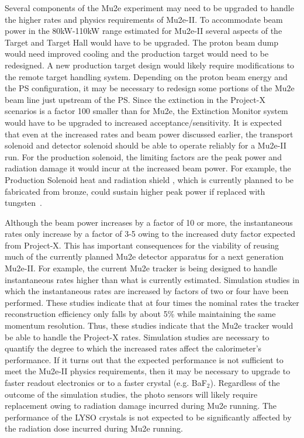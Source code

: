 %

Several components of the Mu2e experiment may need to be upgraded to
handle the higher rates and physics requirements of Mu2e-II.  To
accommodate beam power in the 80kW-110kW range estimated for Mu2e-II
several aspects of the Target and Target Hall would have to be
upgraded.  The proton beam dump would need improved cooling and the
production target would need to be redesigned.  A new production
target design would likely require modifications to the remote target
handling system.  Depending on the proton beam energy and the PS
configuration, it may be necessary to redesign some portions of the
Mu2e beam line just upstream of the PS. Since the extinction in the
Project-X scenarios is a factor 100 smaller than for Mu2e, the
Extinction Monitor system would have to be upgraded to increased
acceptance/sensitivity.  It is expected that even at the increased
rates and beam power discussed earlier, the transport solenoid and
detector solenoid should be able to operate reliably for a Mu2e-II
run. For the production solenoid, the limiting factors are the peak
power and radiation damage it would incur at the increased beam power.
For example, the Production Solenoid heat and radiation shield , which
is currently planned to be fabricated from bronze, could sustain
higher peak power if replaced with tungsten~\cite{Mu2eII}.

Although the beam power increases by a factor of 10 or more, the
instantaneous rates only increase by a factor of 3-5 owing to the
increased duty factor expected from Project-X.  This has important
consequences for the viability of reusing much of the currently
planned Mu2e detector apparatus for a next generation Mu2e-II.  For
example, the current Mu2e tracker is being designed to handle
instantaneous rates higher than what is currently estimated.
Simulation studies in which the instantaneous rates are increased by
factors of two or four have been performed.  These studies indicate
that at four times the nominal rates the tracker reconstruction
efficiency only falls by about 5\% while maintaining the same momentum
resolution.  Thus, these studies indicate that the Mu2e tracker would
be able to handle the Project-X rates.  Simulation studies are
necessary to quantify the degree to which the increased rates affect
the calorimeter's performance.  If it turns out that the expected
performance is not sufficient to meet the Mu2e-II physics
requirements, then it may be necessary to upgrade to faster readout
electronics or to a faster crystal (e.g. BaF$_2$).  Regardless of the
outcome of the simulation studies, the photo sensors will likely
require replacement owing to radiation damage incurred during Mu2e
running.  The performance of the LYSO crystals is not expected to be
significantly affected by the radiation dose incurred during Mu2e
running.

